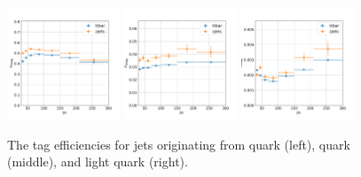 \begin{figure}[h!]
    \centering
    \includegraphics[width=0.3\textwidth]{chapters/Analysis/sectionCalibration/figures/btag/bmva_mceff_vs_pt_b}
    \includegraphics[width=0.3\textwidth]{chapters/Analysis/sectionCalibration/figures/btag/bmva_mceff_vs_pt_c}
    \includegraphics[width=0.3\textwidth]{chapters/Analysis/sectionCalibration/figures/btag/bmva_mceff_vs_pt_usdg}
    \caption{The \PQb tag efficiencies for jets originating from \PQb quark (left), \PQc quark (middle), and light quark (right).
    \label{fig:analysis:calibration:btag_eff}
    }
\end{figure}
\FloatBarrier








